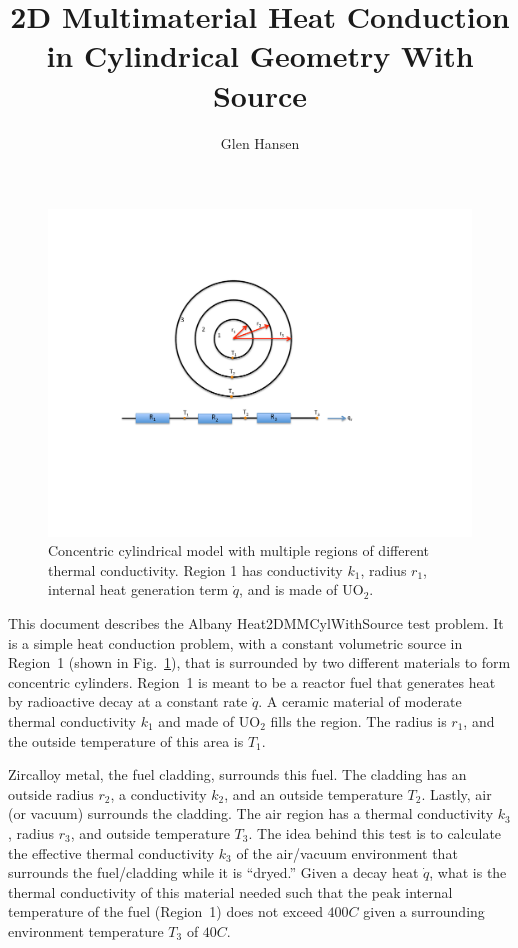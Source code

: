 \documentclass[12pt]{article}
\title{2D Multimaterial Heat Conduction in Cylindrical Geometry With Source}
\author{Glen Hansen}
\newcommand{\uo}{\mathrm{UO}_2}
\begin{document}
\maketitle

\begin{figure}[!htbp]
\includegraphics[width=6.5in,trim=100 200 200 100,clip]{cyl}
\caption{Concentric cylindrical model with multiple regions of different thermal conductivity. Region 1 has
conductivity $k_1$, radius $r_1$, internal heat generation term $\dot{q}$, and is made of $\uo$.}
\label{fig:domain}
\end{figure}


This document describes the Albany Heat2DMMCylWithSource test problem. It is a
simple heat conduction problem, with a constant volumetric source in Region~1
(shown in Fig.~\ref{fig:domain}), that is surrounded by two different materials
to form concentric cylinders. Region~1 is meant to be a reactor fuel that
generates heat by radioactive decay at a constant rate $\dot{q}$. A ceramic
material of moderate thermal conductivity $k_1$ and made of $\uo$ fills the
region. The radius is $r_1$, and the outside temperature of this area is $T_1$.

Zircalloy metal, the fuel cladding, surrounds this fuel. The cladding has an outside radius
$r_2$, a conductivity $k_2$, and an outside temperature $T_2$. Lastly, air (or vacuum) surrounds the
cladding. The air region has a thermal conductivity $k_3$, radius $r_3$, and outside temperature $T_3$.
The idea behind this test is to calculate the effective thermal conductivity $k_3$ of the air/vacuum environment
that surrounds the fuel/cladding while it is ``dryed.'' Given a decay heat $\dot{q}$, what is the thermal
conductivity of this material needed such that the peak internal temperature of the fuel (Region~1) does not
exceed $400 C$ given a surrounding environment temperature $T_3$ of $40 C$.
\end{document}
